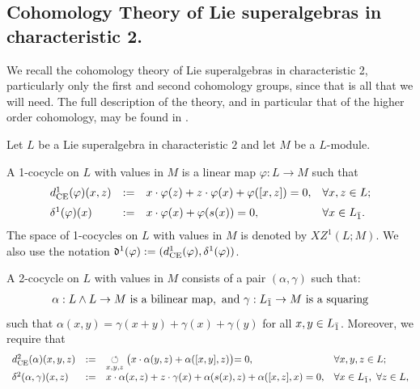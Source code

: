 \documentclass[12pt]{amsart}
\newcommand {\ce}{{\text{CE}}}
\begin{document}
\vspace{0.5 em}

\subsection{Cohomology Theory of Lie superalgebras in characteristic 2.}\label{cohom}We  recall the cohomology theory  of Lie superalgebras in characteristic 2, particularly only the first and second cohomology groups, since that is all that we will need. The full description of the theory, and in particular that of the higher order cohomology, may be found in \cite{BM}.

\vspace{0.5em}

Let $L$ be a Lie superalgebra in characteristic $2$ and let $M$ be a $L$-module. 

A 1-cocycle on $L$ with values in $M$ is a linear map $\varphi: L \rightarrow M$ such that
\begin{equation}\label{1coc}
\begin{array}{llll}
d_{\ce}^1(\varphi)(x,z)&:=&x\cdot \varphi(z)+z \cdot \varphi(x)+\varphi([x,z])=0, & \forall x,z\in L; \\[2mm] 
\delta^1(\varphi)(x)&:=&x\cdot \varphi(x)+\varphi(s(x))=0,&\forall x\in L_\od.
 \end{array}
\end{equation}
The space of 1-cocycles on $L$ with values in $M$ is denoted by $XZ^1(L;M)$. We also use the notation $\fd^1(\varphi):=(d^1_{\ce}(\varphi),\delta^1(\varphi))$.
\vspace{0.5 em}

A 2-cocycle on $L$ with values in $M$ consists of a pair $(\alpha, \gamma)$  such that: 
\[
\begin{array}{l}
\alpha:L\wedge L \rightarrow M \text{ is a bilinear map}, \text{ and } \gamma:L_{{\bar1}} \rightarrow M \text{ is a squaring}
\end{array}
\]
such that $\alpha(x,y)=\gamma(x+y)+\gamma(x)+\gamma(y)$ for all $x,y\in L_{{\bar1}}$. Moreover, we require that 
\begin{equation}\label{2coc}
\begin{array}{llll} 
d_{\ce}^2(\alpha)(x,y,z)&:=&\underset{x,y,z}{\circlearrowleft}\bigl(x \cdot \alpha(y,z)+\alpha([x,y],z)\bigl)=0, &\forall x,y,z\in L; \\[2mm] 
\delta^2(\alpha,\gamma)(x,z)&:=&x\cdot \alpha(x,z)+z \cdot \gamma(x)+\alpha(s(x),z)+\alpha([x,z],x)=0,&\forall x\in L_\od,~\forall z\in L,
 \end{array}
\end{equation} 
\end{document}

